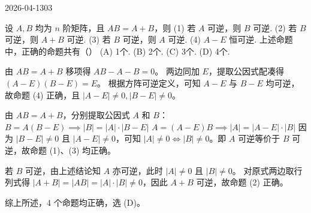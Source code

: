 \begin{mistake}{2026-04-13}{03}

\begin{problemcontent}
设 \(A, B\) 均为 \(n\) 阶矩阵，且 \(AB = A + B\)，则
(1) 若 \(A\) 可逆，则 \(B\) 可逆.
(2) 若 \(B\) 可逆，则 \(A+B\) 可逆.
(3) 若 \(B\) 可逆，则 \(A\) 可逆.
(4) \(A-E\) 恒可逆.
上述命题中，正确的命题共有（\quad）
(A) 1个. \quad (B) 2个. \quad (C) 3个. \quad (D) 4个.
\end{problemcontent}

\begin{solutioncontent}
由 \(AB = A + B\) 移项得 \(AB - A - B = 0\)。
两边同加 \(E\)，提取公因式配凑得 \((A-E)(B-E) = E\)。
根据方阵可逆定义，可知 \(A-E\) 与 \(B-E\) 均可逆，故命题 (4) 正确，且 \(|A-E| \neq 0, |B-E| \neq 0\)。

由 \(AB = A + B\)，分别提取公因式 \(A\) 和 \(B\)：
\(B = A(B-E) \implies |B| = |A| \cdot |B-E|\)
\(A = (A-E)B \implies |A| = |A-E| \cdot |B|\)
因为 \(|B-E| \neq 0\) 且 \(|A-E| \neq 0\)，可知 \(|A| \neq 0 \iff |B| \neq 0\)。即 \(A\) 可逆等价于 \(B\) 可逆，故命题 (1)、(3) 均正确。

若 \(B\) 可逆，由上述结论知 \(A\) 亦可逆，此时 \(|A| \neq 0\) 且 \(|B| \neq 0\)。
对原式两边取行列式得 \(|A+B| = |AB| = |A| \cdot |B| \neq 0\)，因此 \(A+B\) 可逆，故命题 (2) 正确。

综上所述，4 个命题均正确，选 (D)。
\end{solutioncontent}


\end{mistake}
